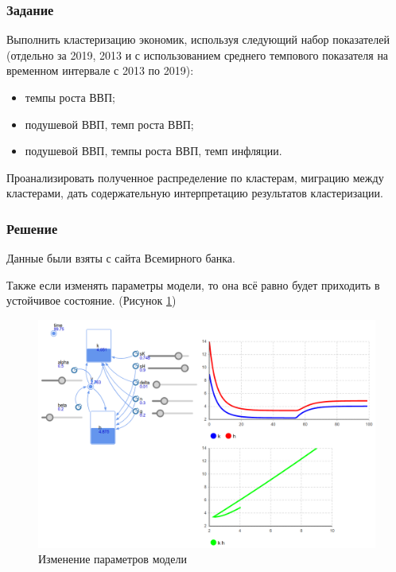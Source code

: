 \documentclass[14pt,fleqn]{extarticle}
\begin{document}
    \subsubsection*{Задание}
    
    Выполнить кластеризацию экономик, используя следующий набор показателей (отдельно за 2019, 2013 и с использованием среднего темпового показателя на временном интервале с 2013 по 2019):
    \begin{itemize}[topsep=0pt,itemsep=-1ex,partopsep=1ex,parsep=1ex]
		\item темпы роста ВВП;
		\item подушевой ВВП, темп роста ВВП;
		\item подушевой ВВП, темпы роста ВВП, темп инфляции.
	\end{itemize}

	Проанализировать полученное распределение по кластерам, миграцию между кластерами, дать содержательную интерпретацию результатов кластеризации.
	
	\subsubsection*{Решение}
	
	Данные были взяты с сайта Всемирного банка.
	
	Также если изменять параметры модели, то она всё равно будет приходить в устойчивое состояние. (Рисунок \ref{fig:M-R-W_anylogic_variance})
	\begin{figure}[h]
		\centering \includegraphics[scale=0.25]{M-R-W_anylogic_variance}
		\caption{Изменение параметров модели}
		\label{fig:M-R-W_anylogic_variance}
	\end{figure}
\end{document}
